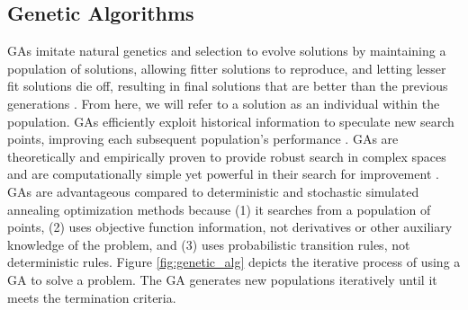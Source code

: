 \subsection{Genetic Algorithms}
\glspl{GA} imitate natural genetics and selection to evolve solutions 
by maintaining a population of solutions, allowing 
fitter solutions to reproduce, and letting lesser fit solutions die off, 
resulting in final solutions that are better than the previous generations 
\cite{renner_genetic_2003}. 
From here, we will refer to a solution as an individual within the population. 
\glspl{GA} efficiently exploit historical information to speculate new search 
points, improving each subsequent population's performance 
\cite{goldberg_genetic_1989}. 
\glspl{GA} are theoretically and empirically proven to provide robust 
search in complex spaces and are computationally simple yet powerful 
in their search for improvement \cite{goldberg_genetic_1989}. 
GAs are advantageous compared to deterministic and stochastic simulated 
annealing optimization methods because (1) it searches from a population of 
points, (2) uses objective function information, not derivatives or other 
auxiliary knowledge of the problem, and (3) uses probabilistic transition 
rules, not deterministic rules. 
Figure \ref{fig:genetic_alg} depicts the iterative process of using a \gls{GA}
to solve a problem. 
The \gls{GA} generates new populations iteratively until it meets the termination 
criteria. 

